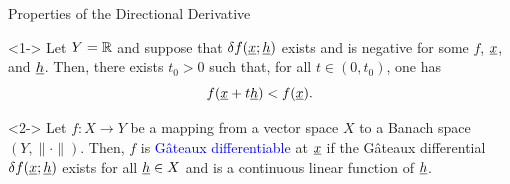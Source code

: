 \documentclass[10pt,english,aspectratio=169]{beamer}
\begin{document}
\begin{frame}{Properties of the Directional Derivative}

\begin{lemma}<1->
Let $Y=\mathbb{R}$ and suppose that $\delta f (\underline{x};\underline{h})$ exists and is negative for some $f$, $\underline{x}$, and $\underline{h}$.  Then, there exists $t_0 > 0$ such that, for all $t\in(0,t_0)$, one has \vspace{-2mm}
\[ f(\underline{x}+t \underline{h}) < f (\underline{x}). \]
\end{lemma}


\vspace{5mm}

\begin{definition}<2->
Let $f \colon X \rightarrow Y$ be a mapping from a vector space $X$ to a Banach space $(Y,\|\cdot\|)$.
Then, $f$ is \textcolor{blue}{G\^{a}teaux differentiable} at $\underline{x}$ if the G\^{a}teaux differential $\delta f (\underline{x};\underline{h})$ exists for all $\underline{h} \in X$ and is a continuous linear function of $\underline{h}$.
\end{definition}

\end{frame}
\end{document}
